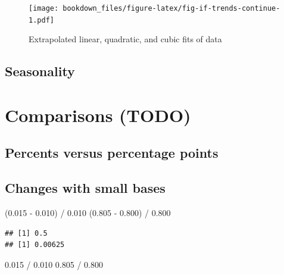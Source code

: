 \documentclass[
]{krantz}
\makeatletter
\newenvironment{Shaded}{\begin{snugshade}}{\end{snugshade}}
\newcommand{\FloatTok}[1]{\textcolor[rgb]{0.06,0.06,0.06}{#1}}
\newcommand{\NormalTok}[1]{#1}
\newcommand{\SpecialCharTok}[1]{\textcolor[rgb]{0,0,0}{#1}}
\newenvironment{kframe}{%
\medskip{}
\setlength{\fboxsep}{.8em}
 \def\at@end@of@kframe{}%
 \ifinner\ifhmode%
  \def\at@end@of@kframe{\end{minipage}}%
  \begin{minipage}{\columnwidth}%
 \fi\fi%
 \def\FrameCommand##1{\hskip\@totalleftmargin \hskip-\fboxsep
 \colorbox{shadecolor}{##1}\hskip-\fboxsep
     \hskip-\linewidth \hskip-\@totalleftmargin \hskip\columnwidth}%
 \MakeFramed {\advance\hsize-\width
   \@totalleftmargin\z@ \linewidth\hsize
   \@setminipage}}%
 {\par\unskip\endMakeFramed%
 \at@end@of@kframe}
\renewenvironment{Shaded}{\begin{kframe}}{\end{kframe}}
\makeatother
\begin{document}
\begin{figure}
\centering
\texttt{[image: bookdown\_files/figure-latex/fig-if-trends-continue-1.pdf]}
\caption{\label{fig:fig-if-trends-continue}Extrapolated linear, quadratic, and cubic fits of data}
\end{figure}

\hypertarget{seasonality}{%
\subsection{Seasonality}\label{seasonality}}

\hypertarget{comparisons-todo}{%
\section{Comparisons (TODO)}\label{comparisons-todo}}

\hypertarget{percents-versus-percentage-points}{%
\subsection{Percents versus percentage points}\label{percents-versus-percentage-points}}

\hypertarget{changes-with-small-bases}{%
\subsection{Changes with small bases}\label{changes-with-small-bases}}

\begin{Shaded}
\begin{Highlighting}[]
\NormalTok{(}\FloatTok{0.015} \SpecialCharTok{{-}} \FloatTok{0.010}\NormalTok{) }\SpecialCharTok{/} \FloatTok{0.010}
\NormalTok{(}\FloatTok{0.805} \SpecialCharTok{{-}} \FloatTok{0.800}\NormalTok{) }\SpecialCharTok{/} \FloatTok{0.800}
\end{Highlighting}
\end{Shaded}

\begin{verbatim}
## [1] 0.5
## [1] 0.00625
\end{verbatim}

\begin{Shaded}
\begin{Highlighting}[]
\FloatTok{0.015} \SpecialCharTok{/} \FloatTok{0.010}
\FloatTok{0.805} \SpecialCharTok{/} \FloatTok{0.800}
\end{Highlighting}
\end{Shaded}
\end{document}
